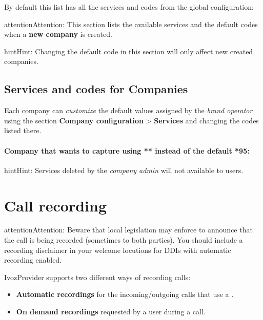 \documentclass[letterpaper,10pt,english]{sphinxmanual}
\begin{document}
By default this list has all the services and codes from the global
configuration:

\begin{notice}{attention}{Attention:}
This section lists the available services and the default codes
when a \textbf{new company} is created.
\end{notice}

\begin{notice}{hint}{Hint:}
Changing the default code in this section will only affect new
created companies.
\end{notice}


\subsection{Services and codes for Companies}
\label{pbx_features/services:services-and-codes-for-companies}
Each company can \emph{customize} the default values assigned by the \emph{brand operator}
using the section \textbf{Company configuration} \textgreater{} \textbf{Services} and changing the codes
listed there.
\paragraph{Company that wants to capture using ** instead of the default *95:}

\noindent{}

\begin{notice}{hint}{Hint:}
Services deleted by the \emph{company admin} will not available to users.
\end{notice}


\section{Call recording}
\label{pbx_features/call_recording:call-recording}\label{pbx_features/call_recording::doc}\label{pbx_features/call_recording:call-recordings}
\begin{notice}{attention}{Attention:}
Beware that local legislation may enforce to announce that the
call is being recorded (sometimes to both parties). You should include
a recording disclaimer in your welcome locutions for DDIs with automatic
recording enabled.
\end{notice}

IvozProvider supports two different ways of recording calls:
\begin{itemize}
\item {} 
\textbf{Automatic recordings} for the incoming/outgoing calls that use a
{\hyperref[pbx_features/external_ddis:external\string-ddis]{}}.

\item {} 
\textbf{On demand recordings} requested by a user during a call.

\end{itemize}
\end{document}
